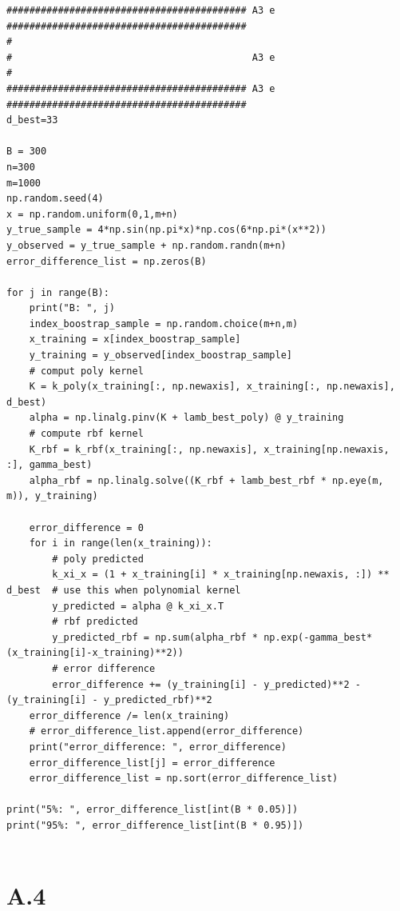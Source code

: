 \documentclass{article}
\begin{document}
\begin{verbatim}
########################################## A3 e ##########################################
#
#                                          A3 e
#
########################################## A3 e ##########################################
d_best=33

B = 300
n=300
m=1000
np.random.seed(4)
x = np.random.uniform(0,1,m+n)
y_true_sample = 4*np.sin(np.pi*x)*np.cos(6*np.pi*(x**2))
y_observed = y_true_sample + np.random.randn(m+n)
error_difference_list = np.zeros(B)

for j in range(B):
	print("B: ", j)
	index_boostrap_sample = np.random.choice(m+n,m)
	x_training = x[index_boostrap_sample]
	y_training = y_observed[index_boostrap_sample]
	# comput poly kernel
	K = k_poly(x_training[:, np.newaxis], x_training[:, np.newaxis], d_best)
	alpha = np.linalg.pinv(K + lamb_best_poly) @ y_training
	# compute rbf kernel
	K_rbf = k_rbf(x_training[:, np.newaxis], x_training[np.newaxis, :], gamma_best)
	alpha_rbf = np.linalg.solve((K_rbf + lamb_best_rbf * np.eye(m, m)), y_training)
	
	error_difference = 0
	for i in range(len(x_training)):
		# poly predicted
		k_xi_x = (1 + x_training[i] * x_training[np.newaxis, :]) ** d_best  # use this when polynomial kernel
		y_predicted = alpha @ k_xi_x.T
		# rbf predicted
		y_predicted_rbf = np.sum(alpha_rbf * np.exp(-gamma_best*(x_training[i]-x_training)**2))
		# error difference
		error_difference += (y_training[i] - y_predicted)**2 - (y_training[i] - y_predicted_rbf)**2
	error_difference /= len(x_training)
	# error_difference_list.append(error_difference)
	print("error_difference: ", error_difference)
	error_difference_list[j] = error_difference
	error_difference_list = np.sort(error_difference_list)

print("5%: ", error_difference_list[int(B * 0.05)])
print("95%: ", error_difference_list[int(B * 0.95)])


\end{verbatim}





\section*{A.4}
\end{document}
